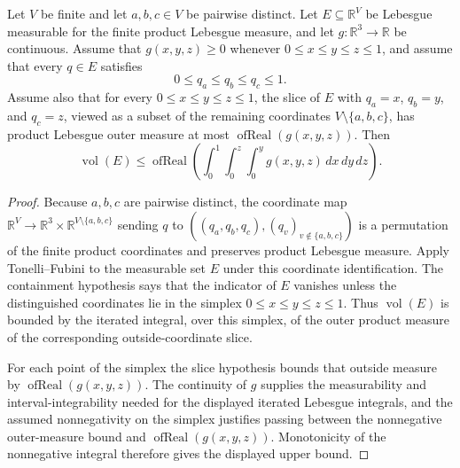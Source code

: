 \begin{helper}
Let \(V\) be finite and let \(a,b,c\in V\) be pairwise distinct.  Let
\(E\subseteq\mathbb R^V\) be Lebesgue measurable for the finite product
Lebesgue measure, and let \(g:\mathbb R^3\to\mathbb R\) be continuous.  Assume
that \(g(x,y,z)\ge0\) whenever \(0\le x\le y\le z\le1\), and assume that every
\(q\in E\) satisfies
\[
0\le q_a\le q_b\le q_c\le 1.
\]
Assume also that for every \(0\le x\le y\le z\le1\), the slice of \(E\) with
\(q_a=x\), \(q_b=y\), and \(q_c=z\), viewed as a subset of the remaining
coordinates \(V\setminus\{a,b,c\}\), has product Lebesgue outer measure at
most \(\operatorname{ofReal}(g(x,y,z))\).  Then
\[
\operatorname{vol}(E)\le
\operatorname{ofReal}\left(\int_0^1\int_0^z\int_0^y
g(x,y,z)\,dx\,dy\,dz\right).
\]
\end{helper}
\begin{proof}
Because \(a,b,c\) are pairwise distinct, the coordinate map
\(\mathbb R^V\to\mathbb R^3\times \mathbb R^{V\setminus\{a,b,c\}}\) sending
\(q\) to \(((q_a,q_b,q_c),(q_v)_{v\notin\{a,b,c\}})\) is a permutation of the
finite product coordinates and preserves product Lebesgue measure.  Apply
Tonelli--Fubini to the measurable set \(E\) under this coordinate
identification.  The containment hypothesis says that the indicator of \(E\)
vanishes unless the distinguished coordinates lie in the simplex
\(0\le x\le y\le z\le1\).  Thus \(\operatorname{vol}(E)\) is bounded by the
iterated integral, over this simplex, of the outer product measure of the
corresponding outside-coordinate slice.

For each point of the simplex the slice hypothesis bounds that outside measure
by \(\operatorname{ofReal}(g(x,y,z))\).  The continuity of \(g\) supplies the
measurability and interval-integrability needed for the displayed iterated
Lebesgue integrals, and the assumed nonnegativity on the simplex justifies
passing between the nonnegative outer-measure bound and
\(\operatorname{ofReal}(g(x,y,z))\).  Monotonicity of the nonnegative integral
therefore gives the displayed upper bound.
\end{proof}
